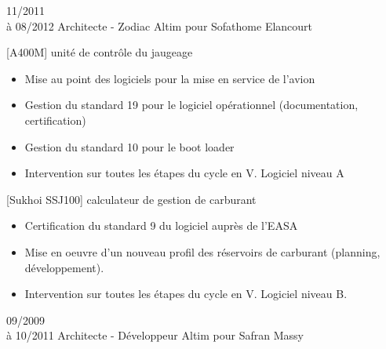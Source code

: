 \documentclass[10pt,a4paper]{moderncv}       %
\begin{document}
\vspace*{3mm}
\cventry
{11/2011\\à 08/2012}   %
{Architecte - Zodiac}  %
{Altim pour Sofathome} %
{Elancourt}            %
{}                     %
{
[A400M] unité de contrôle du jaugeage
\begin{itemize}
\setlength{\itemindent}{2mm}
  \item Mise au point des logiciels pour la mise en service de l’avion
  \item Gestion du standard 19 pour le logiciel opérationnel (documentation, certification)
  \item Gestion du standard 10 pour le boot loader
  \item Intervention sur toutes les étapes du cycle en V. Logiciel niveau A
\end{itemize}
[Sukhoi SSJ100] calculateur de gestion de carburant
\begin{itemize}
\setlength{\itemindent}{2mm}
  \item Certification du standard 9 du logiciel auprès de l’EASA
  \item Mise en oeuvre d’un nouveau profil des réservoirs de carburant (planning, développement).
  \item Intervention sur toutes les étapes du cycle en V. Logiciel niveau B.
\end{itemize}
}
\vspace*{3mm}
\cventry
{09/2009\\à 10/2011}       %
{Architecte - Développeur} %
{Altim pour Safran}        %
{Massy}                    %
{}                         %
\end{document}

